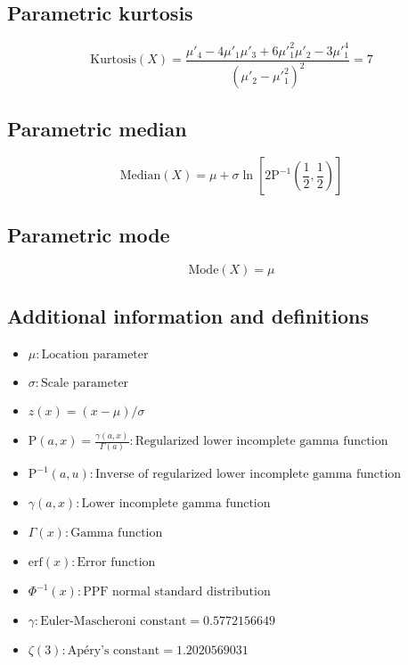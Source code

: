 \documentclass{article}
\begin{document}
\subsection{Parametric kurtosis}
\begin{equation*} \mathrm{Kurtosis}(X)=\frac{\mu'_{4}-4\mu'_{1}\mu'_{3}+6\mu'^{2}_{1}\mu'_{2}-3\mu'^{4}_{1}}{(\mu'_{2}-\mu'^{2}_{1})^{2}}=7 \end{equation*}
\subsection{Parametric median}
\begin{equation*} \mathrm{Median}(X)=\mu+\sigma\ln\left[2\text{P}^{-1}\left(\frac{1}{2},\frac{1}{2}\right)\right] \end{equation*}
\subsection{Parametric mode}
\begin{equation*} \mathrm{Mode}(X)=\mu \end{equation*}
\subsection{Additional information and definitions}
\begin{itemize}
    \item $ \mu:\text{Location parameter} $
    \item $ \sigma:\text{Scale parameter} $
    \item $ z\left(x\right)=\left(x-\mu\right)/\sigma $
    \item $ \text{P}\left(a,x\right)=\frac{\gamma(a,x)}{\Gamma(a)}:\text{Regularized lower incomplete gamma function} $
    \item $ \text{P}^{-1}\left(a,u\right):\text{Inverse of regularized lower incomplete gamma function} $
    \item $ \gamma\left(a,x\right):\text{Lower incomplete gamma function} $
    \item $ \Gamma\left(x\right):\text{Gamma function} $
    \item $ \mathrm{erf}(x):\text{Error function} $
    \item $ \Phi^{-1}\left(x\right):\text{PPF normal standard distribution} $
    \item $ \gamma:\text{Euler-Mascheroni constant}=0.5772156649 $
    \item $ \zeta(3):\text{Apéry's constant}=1.2020569031 $
\end{itemize}
\end{document}

